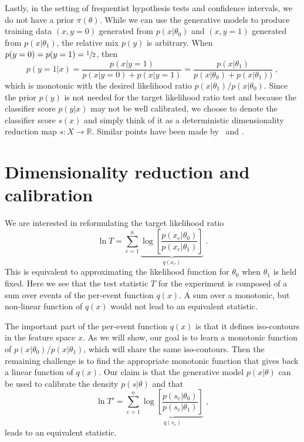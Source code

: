 \documentclass[aoas,preprint]{imsart}
\numberwithin{equation}{section}
\theoremstyle{plain}
\begin{document}

Lastly, in the setting of frequentist hypothesis tests and confidence intervals, we do not have a prior $\pi(\theta)$. 
While we can use the generative models to produce training data $(x,y=0)$ generated 
from $p(x|\theta_0)$ and $(x,y=1)$ generated from $p(x|\theta_1)$, the relative mix $p(y)$ 
is arbitrary.  When $p(y=0)=p(y=1)=\sfrac{1}{2}$, then 
\begin{equation}
p(y=1 | x) = \frac{p(x|y=1)}{p(x|y=0)+p(x|y=1)} = \frac{p(x|\theta_1)}{p(x|\theta_0)+p(x|\theta_1))} \;,
\end{equation}
which is monotonic with the desired likelihood ratio $p(x|\theta_1)/p(x|\theta_0)$.
Since the prior $p(y)$ is not needed for the target likelihood ratio test and because the classifier score $p(y|x)$ may not be well calibrated, we choose to denote the classifier score $s(x)$ and simply think of it as a deterministic dimensionality reduction map $s: X \to \mathbb{R}$.  Similar points have been made by~\cite{ClaytonScott} and \cite{Neal:2007zz}.





\section{Dimensionality reduction and calibration}


We are interested in reformulating the target likelihood ratio  
\begin{equation}
\ln T =   \sum_{e=1}^n \underbrace{\log \left[ \frac {p(x_e | \theta_0) }{ p(x_e | \theta_1) } \right]}_{q(x_e)} \;.
\end{equation}
This is equivalent to approximating the likelihood function for $\theta_0$  when $\theta_1$ is held fixed.
Here we see that the test statistic $T$ for the experiment is composed of a sum over events of the per-event function $q(x)$. A sum over a monotonic, but non-linear function of $q(x)$ would not lead to an equivalent statistic. 

The important part of the per-event function $q(x)$ is that it defines iso-contours in the feature space $x$. As we will show, our goal is to learn a monotonic function of $p(x|\theta_0)/p(x|\theta_1)$, which will share the same iso-contours. Then the remaining challenge is to find the appropriate monotonic function that gives back a linear function of $q(x)$. Our claim is that the generative model $p(x|\theta)$ can be used to calibrate the density $p(s|\theta)$ and that
\begin{equation}\label{eq:envoloping}
\ln T' = \sum_{e=1}^n \underbrace{\log \left[ \frac {p(s_e | \theta_0) }{ p(s_e | \theta_1) } \right]}_{q(s_e)} \;,
\end{equation}
leads to an equivalent statistic.
\end{document}
